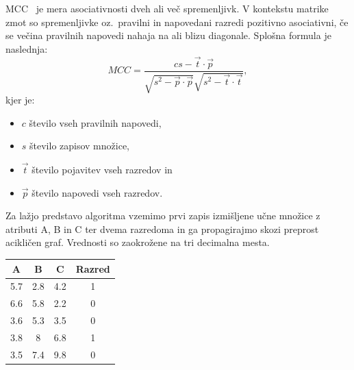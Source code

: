 \documentclass[a4paper,12pt,openright]{book}
\begin{document}
    MCC~\cite{mcc_wiki} je mera asociativnosti dveh ali več spremenljivk.
    V kontekstu matrike zmot so spremenljivke oz.\ pravilni in napovedani razredi pozitivno asociativni, če se večina pravilnih napovedi nahaja na ali blizu diagonale.
    Splošna formula je naslednja:
    \begin{equation}
        MCC={\frac {cs-{\vec {t}}\cdot {\vec {p}}}{{\sqrt {s^{2}-{\vec {p}}\cdot {\vec {p}}}}{\sqrt {s^{2}-{\vec {t}}\cdot {\vec {t}}}}}} ,
        \label{eq:mcc}
    \end{equation}
    kjer je:
    \begin{itemize}
        \item $c$ število vseh pravilnih napovedi,
        \item $s$ število zapisov množice,
        \item $\vec{t}$ število pojavitev vseh razredov in
        \item $\vec{p}$ število napovedi vseh razredov.
    \end{itemize}



    Za lažjo predstavo algoritma vzemimo prvi zapis izmišljene učne množice z atributi A, B in C ter dvema razredoma in ga propagirajmo skozi preprost acikličen graf.
    Vrednosti so zaokrožene na tri decimalna mesta.
    \begin{center}
        \begin{tabular}{||c c c c||}
            \hline
            A & B & C & Razred \\ [0.5ex]
            \hline
            5.7 & 2.8 & 4.2 & 1 \\
            \hline
            6.6 & 5.8 & 2.2 & 0 \\
            \hline
            3.6 & 5.3 & 3.5 & 0 \\
            \hline
            3.8 & 8 & 6.8 & 1 \\
            \hline
            3.5 & 7.4 & 9.8 & 0 \\
            \hline
        \end{tabular}
    \end{center}
\end{document}
